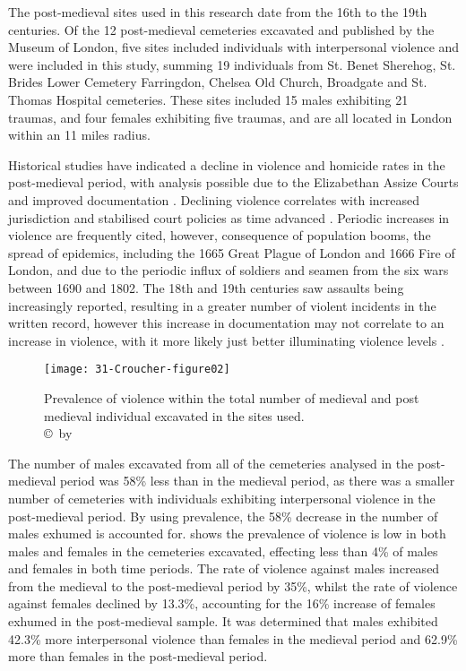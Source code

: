 The post-medieval sites used in this research date from the 16th to the 19th centuries.  Of the 12 post-medieval cemeteries excavated and published by the Museum of London, five sites included individuals with interpersonal violence and were included in this study, summing 19 individuals from St. Benet Sherehog, St. Brides Lower Cemetery Farringdon, Chelsea Old Church, Broadgate and St. Thomas Hospital cemeteries. These sites included 15 males exhibiting 21 traumas, and four females exhibiting five traumas, and are all located in London within an 11 miles radius.  
  
Historical studies have indicated a decline in violence and homicide rates in the post-medieval period, with analysis possible due to the Elizabethan Assize Courts and improved documentation \parencite{gurr1981}.  
Declining violence correlates with increased jurisdiction and stabilised court policies as time advanced \parencites{samaha1974}{stone1983}{sharpe1985}{cockburn1977}. 
Periodic increases in violence are frequently cited, however, consequence of population booms, the spread of epidemics, including the 1665 Great Plague of London and 1666 Fire of London, and due to the periodic influx of soldiers and seamen from the six wars between 1690 and 1802. The 18th and 19th centuries saw assaults being increasingly reported, resulting in a greater number of violent incidents in the written record, however this increase in documentation may not correlate to an increase in violence, with it more likely just better illuminating violence levels \parencite{gurr1981}.

\begin{figure}[!htb]
	\texttt{[image: 31-Croucher-figure02]}
	\caption{Prevalence of violence within the total number of medieval and post medieval individual excavated in the sites used.
		{\normalfont\scriptsize \\ \copyright\ by \shortauthor
	}}
	\label{fig:31-Croucher-figure02}
\end{figure}
The number of males excavated from all of the cemeteries analysed in the post-medieval period was 58\% less than in the medieval period, as there was a smaller number of cemeteries with individuals exhibiting interpersonal violence in the post-medieval period. By using prevalence, the 58\% decrease in the number of males exhumed is accounted for. 
 shows the prevalence of violence is low in both males and females in the cemeteries excavated, effecting less than 4\% of males and females in both time periods.  The rate of violence against males increased from the medieval to the post-medieval period by 35\%, whilst the rate of violence against females declined by 13.3\%, accounting for the 16\% increase of females exhumed in the post-medieval sample. It was determined that males exhibited 42.3\% more interpersonal violence than females in the medieval period and 62.9\% more than females in the post-medieval period. 

